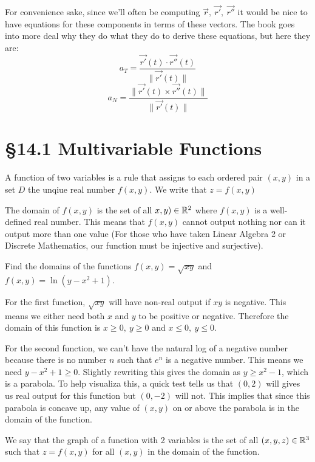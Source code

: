 \documentclass[12 pt]{article}
\begin{document}
        For convenience sake, since we'll often be computing $\vec{r},\ \vec{r'},\ \vec{r''}$ it would be nice to have equations for these components in terms of these vectors. The book goes into more deal why they do what they do to derive these equations, but here they are:
        $$a_T=\frac{\vec{r'}(t)\cdot\vec{r''}(t)}{\parallel\vec{r'}(t)\parallel}$$
        $$a_N=\frac{\parallel\vec{r'}(t)\times\vec{r''}(t)\parallel}{\parallel\vec{r'}(t)\parallel}$$

    \section{\S 14.1 Multivariable Functions}
        \begin{def*}
            A function of two variables is a rule that assigns to each ordered pair $(x,y)$ in a set $D$ the unqiue real number $f(x,y)$. We write that $z=f(x,y)$
        \end{def*}
        The domain of $f(x,y)$ is the set of all $x,y)\in\mathbb{R}^2$ where $f(x,y)$ is a well-defined real number. This means that $f(x,y)$ cannot output nothing nor can it output more than one value (For those who have taken Linear Algebra 2 or Discrete Mathematics, our function must be injective and surjective).

        \begin{exmp*}
            Find the domains of the functions $f(x,y)=\sqrt{xy}$ and $f(x,y)=\ln(y-x^2+1)$.

            For the first function, $\sqrt{xy}$ will have non-real output if $xy$ is negative. This means we either need both $x$ and $y$ to be positive or negative. Therefore the domain of this function is $x\geq 0,\ y\geq 0$ and $x\leq 0,\ y\leq 0$.

            For the second function, we can't have the natural log of a negative number because there is no number $n$ such that $e^n$ is a negative number. This means we need $y-x^2+1\geq 0$. Slightly rewriting this gives the domain as $y\geq x^2-1$, which is a parabola. To help visualiza this, a quick test tells us that $(0,2)$ will gives us real output for this function but $(0,-2)$ will not. This implies that since this parabola is concave up, any value of $(x,y)$ on or above the parabola is in the domain of the function.
        \end{exmp*}

        \begin{def*}
            We say that the graph of a function with 2 variables is the set of all $(x,y,z)\in\mathbb{R}^3$ such that $z=f(x,y)$ for all $(x,y)$ in the domain of the function.
        \end{def*}
\end{document}
